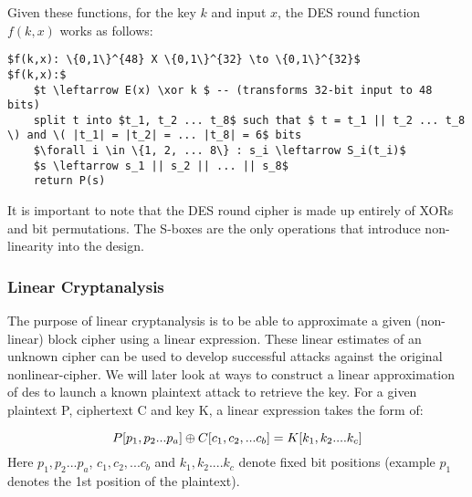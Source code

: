 Given these functions, for the key $k$ and input $x$, the DES round function $f(k, x)$ works as follows: \newline

\lstset{basicstyle=\footnotesize, columns=fullflexible}
\begin{lstlisting}[mathescape]
$f(k,x): \{0,1\}^{48} X \{0,1\}^{32} \to \{0,1\}^{32}$
$f(k,x):$
    $t \leftarrow E(x) \xor k $ -- (transforms 32-bit input to 48 bits) 
    split t into $t_1, t_2 ... t_8$ such that $ t = t_1 || t_2 ... t_8 \) and \( |t_1| = |t_2| = ... |t_8| = 6$ bits 
    $\forall i \in \{1, 2, ... 8\} : s_i \leftarrow S_i(t_i)$
    $s \leftarrow s_1 || s_2 || ... || s_8$
    return P(s)
\end{lstlisting}


 \newline
{}
\par It is important to note that the DES round cipher is made up entirely of XORs and bit permutations. The S-boxes are the only operations that introduce non-linearity into the design.


\subsubsection*{Linear Cryptanalysis} The purpose of linear cryptanalysis is to be able to approximate a given (non-linear) block cipher using a linear expression. These linear estimates of an unknown cipher can be used to develop successful attacks against the original nonlinear-cipher. We will later look at ways to construct a linear approximation of des to launch a known plaintext attack to retrieve the key. \newline
For a given plaintext P, ciphertext C and key K, a linear expression takes the form of: \newline

\begin{equation}
 P[p_1, p_2 ... p_a] {\:\oplus\:} C[c_1, c_2, ... c_b] = K[k_1, k_2 .... k_c] \label{eq:linearapprox}
\end{equation}
Here $p_1, p_2 ... p_a$, $c_1, c_2, ... c_b$ and $k_1, k_2 .... k_c$ denote fixed bit positions (example $p_1$ denotes the 1st position of the plaintext). \newline

